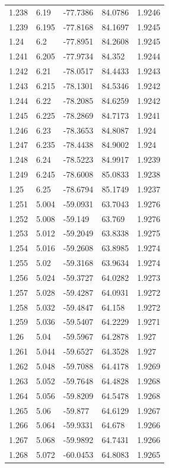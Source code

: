 \begin{tabular}{lllll}
1.238 & 6.19 & -77.7386 & 84.0786 & 1.9246 \\
1.239 & 6.195 & -77.8168 & 84.1697 & 1.9245 \\
1.24 & 6.2 & -77.8951 & 84.2608 & 1.9245 \\
1.241 & 6.205 & -77.9734 & 84.352 & 1.9244 \\
1.242 & 6.21 & -78.0517 & 84.4433 & 1.9243 \\
1.243 & 6.215 & -78.1301 & 84.5346 & 1.9242 \\
1.244 & 6.22 & -78.2085 & 84.6259 & 1.9242 \\
1.245 & 6.225 & -78.2869 & 84.7173 & 1.9241 \\
1.246 & 6.23 & -78.3653 & 84.8087 & 1.924 \\
1.247 & 6.235 & -78.4438 & 84.9002 & 1.924 \\
1.248 & 6.24 & -78.5223 & 84.9917 & 1.9239 \\
1.249 & 6.245 & -78.6008 & 85.0833 & 1.9238 \\
1.25 & 6.25 & -78.6794 & 85.1749 & 1.9237 \\
1.251 & 5.004 & -59.0931 & 63.7043 & 1.9276 \\
1.252 & 5.008 & -59.149 & 63.769 & 1.9276 \\
1.253 & 5.012 & -59.2049 & 63.8338 & 1.9275 \\
1.254 & 5.016 & -59.2608 & 63.8985 & 1.9274 \\
1.255 & 5.02 & -59.3168 & 63.9634 & 1.9274 \\
1.256 & 5.024 & -59.3727 & 64.0282 & 1.9273 \\
1.257 & 5.028 & -59.4287 & 64.0931 & 1.9272 \\
1.258 & 5.032 & -59.4847 & 64.158 & 1.9272 \\
1.259 & 5.036 & -59.5407 & 64.2229 & 1.9271 \\
1.26 & 5.04 & -59.5967 & 64.2878 & 1.927 \\
1.261 & 5.044 & -59.6527 & 64.3528 & 1.927 \\
1.262 & 5.048 & -59.7088 & 64.4178 & 1.9269 \\
1.263 & 5.052 & -59.7648 & 64.4828 & 1.9268 \\
1.264 & 5.056 & -59.8209 & 64.5478 & 1.9268 \\
1.265 & 5.06 & -59.877 & 64.6129 & 1.9267 \\
1.266 & 5.064 & -59.9331 & 64.678 & 1.9266 \\
1.267 & 5.068 & -59.9892 & 64.7431 & 1.9266 \\
1.268 & 5.072 & -60.0453 & 64.8083 & 1.9265 \\

\end{tabular}
